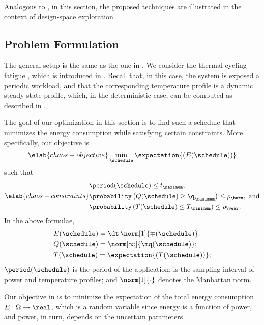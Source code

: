 Analogous to , in this section, the proposed
techniques are illustrated in the context of design-space exploration.

\subsection{Problem Formulation}

The general setup is the same as the one in . We
consider the thermal-cycling fatigue \cite{jedec2016}, which is introduced in
. Recall that, in this case, the system is exposed
a periodic workload, and that the corresponding temperature profile is a dynamic
steady-state profile, which, in the deterministic case, can be computed as
described in .

The goal of our optimization in this section is to find such a schedule
\schedule that minimizes the energy consumption while satisfying certain
constraints. More specifically, our objective is
\begin{equation} \elab{chaos-objective}
  \min_{\schedule} \expectation{(E(\schedule))}
\end{equation}
such that
\begin{equation} \elab{chaos-constraints}
  \begin{split}
    & \period(\schedule) \leq t_\maximum, \\
    & \probability\left(Q(\schedule) \geq \q_\maximum\right) \leq \rho_\burn, \text{ and} \\
    & \probability\left(T(\schedule) \leq T_\minimum\right) \leq \rho_\wear.
  \end{split}
\end{equation}
In the above formulae,
\begin{align*}
  & E(\schedule) = \dt \, \norm[1]{\mp(\schedule)}; \\
  & Q(\schedule) = \norm[\infty]{\mq(\schedule)}; \\
  & T(\schedule) = \expectation{\left(T(\schedule)\right)};
\end{align*}
$\period(\schedule)$ is the period of the application; \dt is the sampling
interval of power and temperature profiles; and $\norm[1]{\cdot}$ denotes the
Manhattan norm.

Our objective in  is to minimize the expectation of the
total energy consumption $E: \Omega \to \real$, which is a random variable since
energy is a function of power, and power, in turn, depends on the uncertain
parameters \vu.

